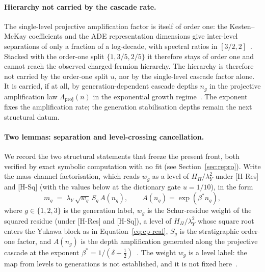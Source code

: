 \documentclass[11pt]{article}
\theoremstyle{definition}
\theoremstyle{remark}
\newcommand{\Hpi}{H_{\Pi}}
\newcommand{\lamY}{\lambda_{Y}}
\begin{document}
    \paragraph{Hierarchy not carried by the cascade rate.}
      The single-level projective amplification factor is itself of order one: the Kesten--McKay coefficients and the
      ADE representation dimensions give inter-level separations of only a fraction of a log-decade, with spectral
      ratios in \([3/2, 2]\)~\cite{Beau2026a5}.
      Stacked with the order-one split \(\{1, 3/5, 2/5\}\) it therefore stays of order one and cannot reach the
      observed charged-fermion hierarchy.
      The hierarchy is therefore not carried by the order-one split \(u\), nor by the single-level cascade factor
      alone.
      It is carried, if at all, by generation-dependent cascade depths \(n_g\) in the projective amplification law
      \(\Lambda_{\mathrm{proj}}(n)\) in the exponential growth regime~\cite{Beau2026a5}.
      The exponent fixes the amplification rate; the generation stabilisation depths remain the next structural datum.

    \paragraph{Two lemmas: separation and level-crossing cancellation.}
      We record the two structural statements that freeze the present front, both verified by exact symbolic
      computation with no fit (see Section~\ref{sec:repro}).
      Write the mass-channel factorisation, which reads $w_g$ as a level of $\Hpi/\lamY^{2}$ under [H-Res] and [H-Sq]
      (with the values below at the dictionary gate $u = 1/10$), in the form
      \begin{equation}
        \label{eq:mass-factorisation}
        m_g \;=\; \lamY\, \sqrt{w_g}\, S_g\, A(n_g),
        \qquad A(n_g) = \exp(\beta^{\ast} n_g),
      \end{equation}
      where \(g\in\{1,2,3\}\) is the generation label, \(w_g\) is the Schur-residue weight of the squared
      residue (under [H-Res] and [H-Sq]), a level of \(\Hpi/\lamY^{2}\) whose square root enters the Yukawa block as in
      Equation~\eqref{eq:cp-real}, \(S_g\) is the stratigraphic order-one factor, and \(A(n_g)\) is the depth
      amplification
      generated along the projective cascade at the exponent \(\beta^{\ast}=1/(\delta+\tfrac12)\)~\cite{Beau2026a20}.
      The weight \(w_g\) is a level label: the map from levels to generations is not established, and it is
      not fixed here~\cite{Beau2026pyl}.
\end{document}
